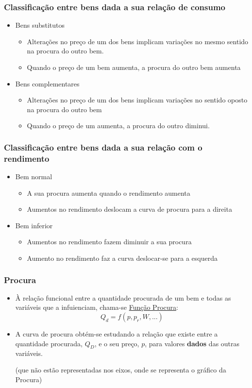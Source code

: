 \begin{frame}
	\frametitle{Classifica\c c\~ao entre bens dada a sua rela\c c\~ao de consumo}
	\begin{itemize}
		\item Bens substitutos
		\begin{itemize}
			\item Altera\c c\~oes no pre\c co de um dos bens implicam varia\c c\~oes no mesmo sentido na procura do outro bem.
			\item Quando o pre\c co de um bem aumenta, a procura do outro bem aumenta
		\end{itemize}
		\item Bens complementares
		\begin{itemize}
			\item Altera\c c\~oes no pre\c co de um dos bens implicam varia\c c\~oes no sentido oposto na procura do outro bem
			\item Quando o pre\c co de um aumenta, a procura do outro diminui.
		\end{itemize}
	\end{itemize}
\end{frame}

\begin{frame}
	\frametitle{Classifica\c c\~ao entre bens dada a sua rela\c c\~ao com o rendimento}
	\begin{itemize}
		\item Bem normal
		\begin{itemize}
			\item A sua procura aumenta quando o rendimento aumenta
			\item Aumentos no rendimento deslocam a curva de procura para a direita
		\end{itemize}
		\item Bem inferior
		\begin{itemize}
			\item Aumentos no rendimento fazem diminuir a sua procura
			\item Aumento no rendimento faz a curva deslocar-se para a esquerda
		\end{itemize}
	\end{itemize}
\end{frame}

\begin{frame}
	\frametitle{Procura}
	\begin{itemize}
		\item \`A rela\c c\~ao funcional entre a quantidade procurada de um bem e todas as vari\'aveis que a infuienciam, chama-se \underline{Fun\c c\~ao Procura}: \[Q_d=f(p,p_r,W,...)\]
		\item A curva de procura obt\'em-se estudando a rela\c c\~ao que existe entre a quantidade procurada, {\color{red}\(Q_D\)}, e o seu pre\c co, {\color{red}\(p\)}, para valores \textbf{dados} das outras vari\'aveis.

		{\small (que n\~ao est\~ao representadas nos eixos, onde se representa o gr\'afico da Procura)}
	\end{itemize}
\end{frame}

